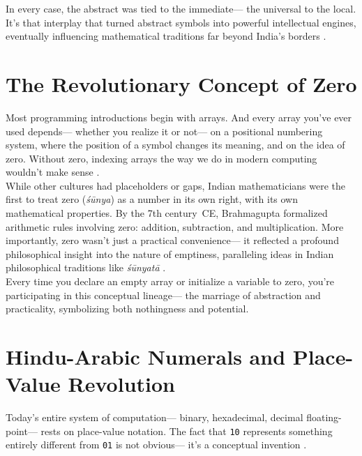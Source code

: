 In every case, the abstract was tied to the immediate---%
the universal to the local. It’s that interplay that turned abstract symbols into powerful intellectual engines, eventually influencing mathematical traditions far beyond India’s borders \cite{mj_college}.

\section{The Revolutionary Concept of Zero}

Most programming introductions begin with arrays. And every array you’ve ever used depends---%
whether you realize it or not---%
on a positional numbering system, where the position of a symbol changes its meaning, and on the idea of zero. Without zero, indexing arrays the way we do in modern computing wouldn’t make sense \cite{wiki_indian_math}.\\

While other cultures had placeholders or gaps, Indian mathematicians were the first to treat zero (\emph{śūnya}) as a number in its own right, with its own mathematical properties. By the 7th century~CE, Brahmagupta formalized arithmetic rules involving zero: addition, subtraction, and multiplication. More importantly, zero wasn’t just a practical convenience---%
it reflected a profound philosophical insight into the nature of emptiness, paralleling ideas in Indian philosophical traditions like \emph{śūnyatā} \cite{vajiram_ravi,mj_college}.\\

Every time you declare an empty array or initialize a variable to zero, you’re participating in this conceptual lineage---%
the marriage of abstraction and practicality, symbolizing both nothingness and potential.

\section{Hindu-Arabic Numerals and Place-Value Revolution}

Today’s entire system of computation---%
binary, hexadecimal, decimal floating-point---%
rests on place-value notation. The fact that \texttt{10} represents something entirely different from \texttt{01} is not obvious---%
it’s a conceptual invention \cite{ukessays_indian_math}.\\

